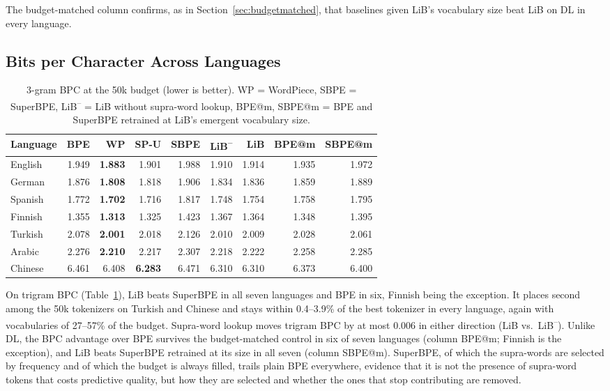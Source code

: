 \documentclass[pdflatex,sn-apa]{sn-jnl}
\begin{document}
The budget-matched column confirms, as in Section~\ref{sec:budgetmatched}, that baselines given LiB's vocabulary size beat LiB on DL in every language.

\subsection{Bits per Character Across Languages}

\begin{table}[t]
\centering
\small
\setlength{\tabcolsep}{4pt}
\begin{tabular}{lrrrrrrrr}
\toprule
\textbf{Language} & \textbf{BPE} & \textbf{WP} & \textbf{SP-U} & \textbf{SBPE}
& \textbf{LiB\textsuperscript{--}} & \textbf{LiB} & \textbf{BPE@m} & \textbf{SBPE@m} \\
\midrule
English  & 1.949 & \textbf{1.883} & 1.901 & 1.988 & 1.910 & 1.914 & 1.935 & 1.972 \\
German   & 1.876 & \textbf{1.808} & 1.818 & 1.906 & 1.834 & 1.836 & 1.859 & 1.889 \\
Spanish  & 1.772 & \textbf{1.702} & 1.716 & 1.817 & 1.748 & 1.754 & 1.758 & 1.795 \\
Finnish  & 1.355 & \textbf{1.313} & 1.325 & 1.423 & 1.367 & 1.364 & 1.348 & 1.395 \\
Turkish  & 2.078 & \textbf{2.001} & 2.018 & 2.126 & 2.010 & 2.009 & 2.028 & 2.061 \\
Arabic   & 2.276 & \textbf{2.210} & 2.217 & 2.307 & 2.218 & 2.222 & 2.258 & 2.285 \\
Chinese  & 6.461 & 6.408 & \textbf{6.283} & 6.471 & 6.310 & 6.310 & 6.373 & 6.400 \\
\bottomrule
\end{tabular}
\caption{3-gram BPC at the 50k budget (lower is better). WP = WordPiece,
SBPE = SuperBPE, LiB\textsuperscript{--} = LiB without supra-word lookup,
BPE@m, SBPE@m = BPE and SuperBPE retrained at LiB's emergent vocabulary
size.}
\label{tab:bpc_multi}
\end{table}

On trigram BPC (Table~\ref{tab:bpc_multi}), LiB beats SuperBPE in all seven
languages and BPE in six, Finnish being the exception. It places second
among the 50k tokenizers on Turkish and Chinese and stays within 0.4--3.9\%
of the best tokenizer in every language, again with vocabularies of
27--57\% of the budget.
Supra-word lookup moves trigram BPC by at most 0.006 in either direction
(LiB vs.\ LiB\textsuperscript{--}). Unlike DL, the BPC advantage over BPE
survives the budget-matched control in six of seven languages
(column BPE@m; Finnish is the exception), and LiB beats SuperBPE retrained
at its size in all seven (column SBPE@m).
SuperBPE, of which the supra-words are selected by frequency and of which the budget is
always filled, trails plain BPE everywhere, evidence that it is not the
presence of supra-word tokens that costs predictive quality, but how they
are selected and whether the ones that stop contributing are removed.
\end{document}

